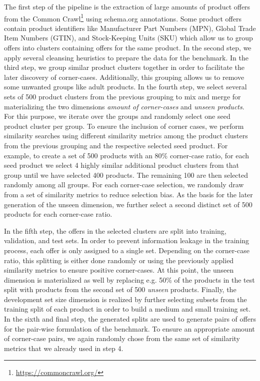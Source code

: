 \documentclass[sigconf,edbt]{acmart-edbt2024}
\begin{document}
The first step of the pipeline is the extraction of large amounts of product offers from the Common Crawl\footnote{\url{https://commoncrawl.org/}} using schema.org annotations. Some product offers contain product identifiers like Manufacturer Part Numbers (MPN), Global Trade Item Numbers (GTIN), and Stock-Keeping Units (SKU) which allow us to group offers into clusters containing offers for the same product.  In the second step, we apply several cleansing heuristics to prepare the data for the benchmark. 
In the third step, we group similar product clusters together in order to facilitate the later discovery of corner-cases. Additionally, this grouping allows us to remove some unwanted groups like adult products. In the fourth step, we select several sets of 500 product clusters from the previous grouping to mix and merge for materializing the two dimensions \textit{amount of corner-cases} and \textit{unseen products}. For this purpose, we iterate over the groups and randomly select one seed product cluster per group. To ensure the inclusion of corner cases, we perform similarity searches using different similarity metrics among the product clusters from the previous grouping and the respective selected seed product. For example, to create a set of 500 products with an 80\% corner-case ratio, for each seed product we select 4 highly similar additional product clusters from that group until we have selected 400 products. The remaining 100 are then selected randomly among all groups. For each corner-case selection, we randomly draw from a set of similarity metrics to reduce selection bias. As the basis for the later generation of the unseen dimension, we further select a second distinct set of 500 products for each corner-case ratio.

In the fifth step, the offers in the selected clusters are split into training, validation, and test sets. In order to prevent information leakage in the training process, each offer is only assigned to a single set. Depending on the corner-case ratio, this splitting is either done randomly or using the previously applied similarity metrics to ensure positive corner-cases. At this point, the unseen dimension is materialized as well by replacing e.g. 50\% of the products in the test split with products from the second set of 500 \textit{unseen} products. Finally, the development set size dimension is realized by further selecting subsets from the training split of each product in order to build a medium and small training set. In the sixth and final step, the generated splits are used to generate pairs of offers for the pair-wise formulation of the benchmark. To ensure an appropriate amount of corner-case pairs, we again randomly chose from the same set of similarity metrics that we already used in step 4.
\end{document}
